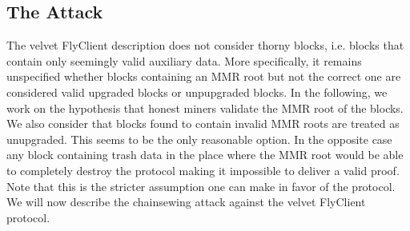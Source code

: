 \subsection{The Attack}
	The  velvet FlyClient description does not consider thorny blocks, i.e. blocks that contain only seemingly valid auxiliary data. 
    More specifically, it remains unspecified whether blocks containing an MMR root but not the correct one are considered valid upgraded blocks or unpupgraded blocks. 
    In the following, we work on the hypothesis that honest miners validate the MMR root of the blocks. We also consider that blocks found to contain 
    invalid MMR roots are treated as unupgraded. 
    This seems to be the only reasonable option. In the opposite case any block containing trash data in the place where the MMR root would be able to 
    completely destroy the protocol making it impossible to deliver a valid proof. Note that this is the stricter assumption one can make in favor of the protocol. 
    We will now describe the chainsewing attack against the velvet FlyClient protocol.

